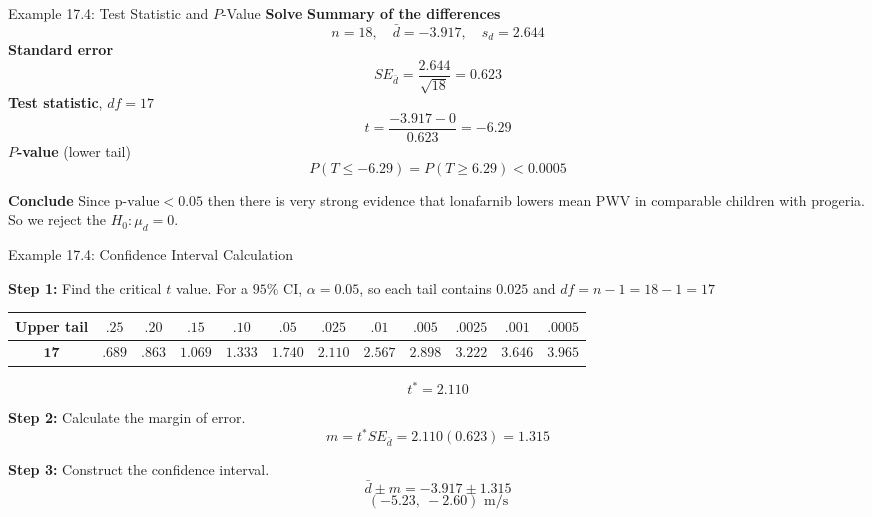 \documentclass[aspectratio=169,10pt]{beamer}
\newcommand{\step}[1]{\textcolor{CourseBlue}{\textbf{#1}}\quad}
\begin{document}
\begin{frame}{Example 17.4: Test Statistic and $P$-Value}
\step{Solve}
\textbf{Summary of the differences}
$$n=18,\quad\bar{d}=-3.917,\quad s_d=2.644$$
\textbf{Standard error}
$$SE_{\bar{d}}=\frac{2.644}{\sqrt{18}}=0.623$$
\textbf{Test statistic}, $df=17$
$$t=\frac{-3.917-0}{0.623}=-6.29$$
\textbf{$P$-value} (lower tail)
$$P(T\le-6.29)=P(T\geq6.29)<0.0005$$

\vspace{0.3cm}
\step{Conclude} Since $\text{p-value} < 0.05$ then there is very strong evidence that lonafarnib lowers mean PWV in comparable children with progeria. So we reject the $H_0:\mu_d=0$.
\end{frame}

\begin{frame}{Example 17.4: Confidence Interval Calculation}

\small
\textbf{Step 1:} Find the critical $t$ value.
For a $95\%$ CI, $\alpha=0.05$, so each tail contains $0.025$ and $df=n-1=18-1=17$

\begin{center}
\scriptsize
\setlength{\tabcolsep}{3.2pt}
\renewcommand{\arraystretch}{1.4}
\begin{tabular}{c|ccccccccccc}
\toprule
\textbf{Upper tail}
& $.25$ & $.20$ & $.15$ & $.10$ & $.05$
& $\mathbf{.025}$ & $.01$ & $.005$ & $.0025$
& $.001$ & $.0005$ \\
\midrule
$\mathbf{17}$
& $.689$ & $.863$ & $1.069$ & $1.333$
& $1.740$ & $\mathbf{2.110}$ & $2.567$ & $2.898$
& $3.222$ & $3.646$ & $3.965$ \\
\bottomrule
\end{tabular}
\end{center}
$$\boxed{t^*=2.110}$$

\vspace{0.05cm}
\textbf{Step 2:} Calculate the margin of error.
$$m=t^*SE_{\bar{d}}=2.110(0.623)=1.315$$

\vspace{0.05cm}
\textbf{Step 3:} Construct the confidence interval.
$$\bar{d}\pm m=-3.917\pm1.315$$
$$\boxed{(-5.23,\ -2.60)\text{ m/s}}$$
\end{frame}
\end{document}
